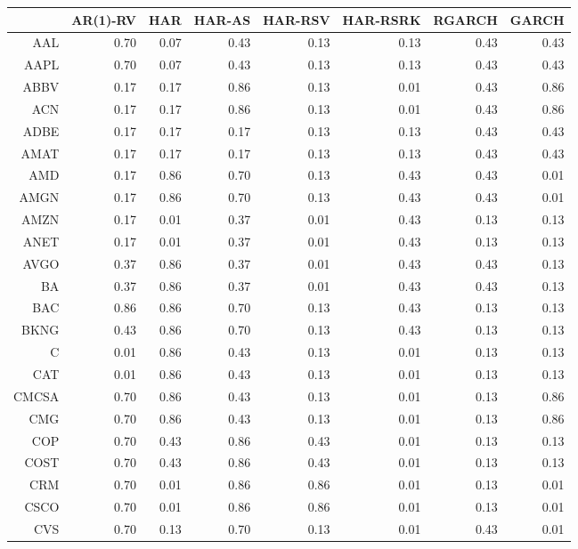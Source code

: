 \begin{table}[ht]
\centering
\begin{tabular}{rrrrrrrr}
  \hline
 & AR(1)-RV & HAR & HAR-AS & HAR-RSV & HAR-RSRK & RGARCH & GARCH \\ 
  \hline
AAL & 0.70 & 0.07 & 0.43 & 0.13 & 0.13 & 0.43 & 0.43 \\ 
  AAPL & 0.70 & 0.07 & 0.43 & 0.13 & 0.13 & 0.43 & 0.43 \\ 
  ABBV & 0.17 & 0.17 & 0.86 & 0.13 & 0.01 & 0.43 & 0.86 \\ 
  ACN & 0.17 & 0.17 & 0.86 & 0.13 & 0.01 & 0.43 & 0.86 \\ 
  ADBE & 0.17 & 0.17 & 0.17 & 0.13 & 0.13 & 0.43 & 0.43 \\ 
  AMAT & 0.17 & 0.17 & 0.17 & 0.13 & 0.13 & 0.43 & 0.43 \\ 
  AMD & 0.17 & 0.86 & 0.70 & 0.13 & 0.43 & 0.43 & 0.01 \\ 
  AMGN & 0.17 & 0.86 & 0.70 & 0.13 & 0.43 & 0.43 & 0.01 \\ 
  AMZN & 0.17 & 0.01 & 0.37 & 0.01 & 0.43 & 0.13 & 0.13 \\ 
  ANET & 0.17 & 0.01 & 0.37 & 0.01 & 0.43 & 0.13 & 0.13 \\ 
  AVGO & 0.37 & 0.86 & 0.37 & 0.01 & 0.43 & 0.43 & 0.13 \\ 
  BA & 0.37 & 0.86 & 0.37 & 0.01 & 0.43 & 0.43 & 0.13 \\ 
  BAC & 0.86 & 0.86 & 0.70 & 0.13 & 0.43 & 0.13 & 0.13 \\ 
  BKNG & 0.43 & 0.86 & 0.70 & 0.13 & 0.43 & 0.13 & 0.13 \\ 
  C & 0.01 & 0.86 & 0.43 & 0.13 & 0.01 & 0.13 & 0.13 \\ 
  CAT & 0.01 & 0.86 & 0.43 & 0.13 & 0.01 & 0.13 & 0.13 \\ 
  CMCSA & 0.70 & 0.86 & 0.43 & 0.13 & 0.01 & 0.13 & 0.86 \\ 
  CMG & 0.70 & 0.86 & 0.43 & 0.13 & 0.01 & 0.13 & 0.86 \\ 
  COP & 0.70 & 0.43 & 0.86 & 0.43 & 0.01 & 0.13 & 0.13 \\ 
  COST & 0.70 & 0.43 & 0.86 & 0.43 & 0.01 & 0.13 & 0.13 \\ 
  CRM & 0.70 & 0.01 & 0.86 & 0.86 & 0.01 & 0.13 & 0.01 \\ 
  CSCO & 0.70 & 0.01 & 0.86 & 0.86 & 0.01 & 0.13 & 0.01 \\ 
  CVS & 0.70 & 0.13 & 0.70 & 0.13 & 0.01 & 0.43 & 0.01 \\ 

\end{tabular}
\end{table}
